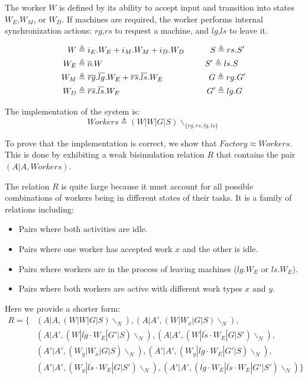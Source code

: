 The worker $W$ is defined by its ability to accept input and transition into states $W_E$,$W_M$, or $W_D$. If machines are required, the worker performs internal synchronization actions: $rg$,$rs$ to request a machine, and $lg$,$ls$ to leave it. 

\begin{align*}
    W&\triangleq i_E.W_E+i_M.W_M+i_D.W_D \hspace{1.1cm}S\triangleq rs.S'\\
    W_E&\triangleq \overline{o}.W \hspace{4.35cm}S'\triangleq ls.S\\
    W_M&\triangleq\overline{rg}.\overline{lg}.W_E+\overline{rs}.\overline{ls}.W_E \hspace{1.95cm}G\triangleq rg.G'\\
    W_D&\triangleq \overline{rs}.\overline{ls}.W_E \hspace{3.7cm}G'\triangleq lg.G
\end{align*}

The implementation of the system is:
\begin{equation*}
    Workers\triangleq (W|W|G|S)\backslash_{\{rg,rs,lg,ls\}}
\end{equation*}

To prove that the implementation is correct, we show that $Factory\approx Workers$. This is done by exhibiting a weak bisimulation relation $R$ that contains the pair $(A|A,Workers)$.

The relation $R$ is quite large because it must account for all possible combinations of workers being in different states of their tasks. It is a family of relations including:
\begin{itemize}
    \item Pairs where both activities are idle.
    \item Pairs where one worker has accepted work $x$ and the other is idle.
    \item Pairs where workers are in the process of leaving machines ($lg.W_E$ or $ls.W_E$).
    \item Pairs where both workers are active with different work types $x$ and $y$.
\end{itemize}

Here we provide a shorter form:
\begin{align*}
    R = \{
        &(A|A, (W|W|G|S)\backslash_N), (A|A', (W|W_x|G|S)\backslash_N),\\
        &(A|A', (W|\overline{lg}\cdot W_E|G'|S)\backslash_N), (A|A', (W|\overline{ls}\cdot W_E|G|S')\backslash_N),\\
        &(A'|A', (W_y|W_x|G|S)\backslash_N), (A'|A', (W_y|\overline{lg}\cdot W_E|G'|S)\backslash_N),\\
        &(A'|A', (W_y|\overline{ls}\cdot W_E|G|S')\backslash_N), (A'|A', (\overline{lg}\cdot W_E|\overline{ls}\cdot W_E|G'|S')\backslash_N)
    \}
\end{align*}

